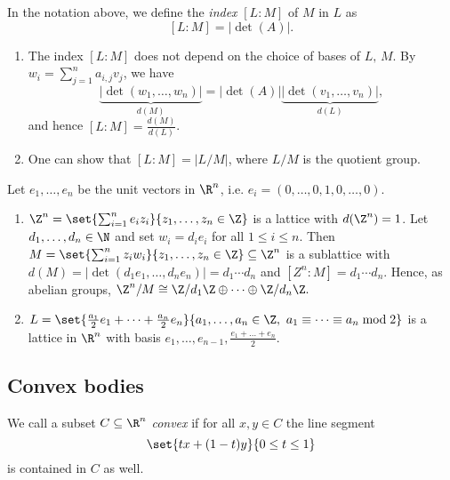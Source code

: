 \begin{defn*}
	In the notation above, we define the \emph{index} \( [L:M] \) of \( M \) in \( L \) as
	\[ [L:M] = |\det(A)|. \]
\end{defn*}

\begin{rem*}
	\begin{enumerate}
		\item The index \( [L:M] \) does not depend on the choice of bases of \( L,\, M \).
			By \( w_i = \sum_{j=1}^{n} a_{i,j}v_j \), we have
			\[ \underbrace{|\det(w_1, \dotsc, w_n)|}_{d(M)} = |\det(A)| \underbrace{|\det(v_1, \dotsc, v_n)|}_{d(L)}, \]
			and hence \( [L:M] = \frac{d(M)}{d(L)} \).
		\item One can show that \( [L:M] = |L/M| \), where \( L/M \) is the quotient group.
	\end{enumerate}
\end{rem*}

\begin{exmp*}
	Let \( e_1, \dotsc, e_n \) be the unit vectors in \( \R^n \), i.e. \( e_i = (0, \dotsc, 0, 1, 0, \dotsc, 0) \).
	\begin{enumerate}
		\item \( \Z^n = \set{\sum_{i=1}^{n} e_i z_i}{z_1, \dotsc, z_n \in \Z} \) is a lattice with \( d(\Z^n) = 1 \).
			Let \( d_1, \dotsc, d_n \in \N \) and set \( w_i = d_i e_i \) for all \( 1 \leq i \leq n \).
			Then \( M = \set{\sum_{i=1}^{n} z_i w_i}{z_1, \dotsc, z_n \in \Z} \subseteq \Z^n \) is a sublattice with \( d(M) = |\det(d_1e_1, \dotsc, d_ne_n)| = d_1 \dotsm d_n \) and \( [Z^n:M] = d_1 \dotsm d_n \).
			Hence, as abelian groups, \( \Z^n/M \cong \Z/d_1 \Z \oplus \dots \oplus \Z/d_n\Z. \)
		\item \( L = \set{\frac{a_1}{2} e_1 + \dots + \frac{a_n}{2} e_n}{a_1, \dotsc, a_n \in \Z,\ a_1 \equiv \dots \equiv a_n \bmod 2} \) is a lattice in \( \R^n \) with basis \( e_1, \dotsc, e_{n-1}, \frac{e_1 + \dots + e_n}{2} \).
	\end{enumerate}
\end{exmp*}

\subsection*{Convex bodies}

\begin{defn*}
	We call a subset \( C \subseteq \R^n \) \emph{convex} if for all \( x, y \in C \) the line segment 
	\[ \set{tx + (1-t)y}{0 \leq t \leq 1} \]
	is contained in \( C \) as well.
\end{defn*}

